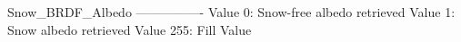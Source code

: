 \begin{smallverbatim}
Snow_BRDF_Albedo
----------------
 Value 0: Snow-free albedo retrieved  
 Value 1: Snow albedo retrieved 
 Value 255: Fill Value
\end{smallverbatim}

\address{GRASS Development Team\\
  \url{http://grass.osgeo.org}\\
  }


